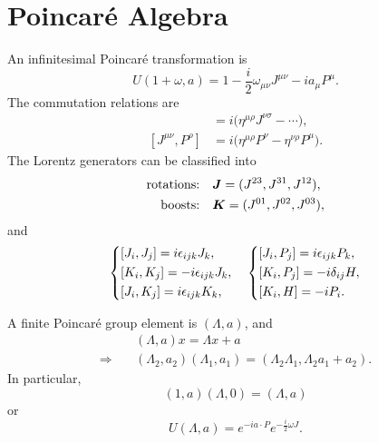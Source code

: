 \section{Poincar\'e Algebra}
An infinitesimal Poincar\'e transformation is
\begin{equation}
    U(1 + \omega, a) = 1 - \frac{i}{2} \omega_{\mu \nu} J^{\mu \nu} - i a_\mu P^\mu.
\end{equation}
The commutation relations are
\begin{align}
    [J^{\mu \nu}, J^{\rho \sigma}] & = i \bigl(\eta^{\mu \rho} J^{\nu \sigma} - \cdots \bigr), \\
    [J^{\mu \nu}, P^\rho] & = i \bigl(\eta^{\mu \rho} P^\nu - \eta^{\nu \rho} P^\mu \bigr).
\end{align}
The Lorentz generators can be classified into
\begin{align}
    \text{rotations:} \quad & \boldsymbol{J} = (J^{23}, J^{31}, J^{12}), \notag \\
    \text{boosts:} \quad & \boldsymbol{K} = (J^{01}, J^{02}, J^{03}),
\end{align}
and
\begin{equation}
    \begin{dcases}
        [J_i, J_j] = i \epsilon_{i j k} J_k, \\
        [K_i, K_j] = - i \epsilon_{i j k} J_k, \\
        [J_i, K_j] = i \epsilon_{i j k} K_k,
    \end{dcases} \quad \begin{dcases}
        [J_i, P_j] = i \epsilon_{i j k} P_k, \\
        [K_i, P_j] = - i \delta_{i j} H, \\
        [K_i, H] = - i P_i.
    \end{dcases}
\end{equation}
\begin{framed}
    A finite Poincar\'e group element is $(\Lambda, a)$, and
    \begin{align}
        & (\Lambda, a) x = \Lambda x + a \\
        \Rightarrow \quad & (\Lambda_2, a_2) (\Lambda_1, a_1) = (\Lambda_2 \Lambda_1, \Lambda_2 a_1 + a_2).
    \end{align}
    In particular,
    \begin{equation}
        (1, a) (\Lambda, 0) = (\Lambda, a)
    \end{equation}
    or
    \begin{equation}
        U(\Lambda, a) = e^{ - i a \cdot P} e^{ - \frac{i}{2} \omega J}.
    \end{equation}
\end{framed}
